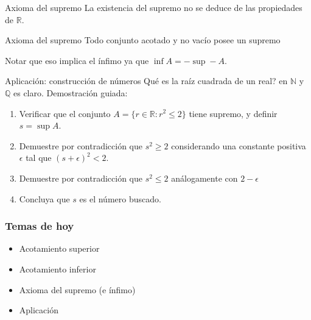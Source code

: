 \documentclass[14pt,aspectratio=169,xcolor=dvipsnames]{beamer}
\newcommand{\R}{\mathbb{R}}
\begin{document}
\begin{frame}{Axioma del supremo}
    La existencia del supremo no se deduce de las propiedades de $\R$. 
    \begin{block}{Axioma del supremo}
        Todo conjunto acotado y no vacío posee un supremo
    \end{block}
    \pause Notar que eso implica el ínfimo ya que $\inf A = - \sup -A$.
\end{frame}
\begin{frame}{Aplicación: construcción de números}
    Qué es la raíz cuadrada de un real? 
    \pause en $\mathbb N$ y $\mathbb Q$ es claro. Demostración guiada:
    \begin{enumerate}
        \item Verificar que el conjunto $A=\{r\in \R: r^2\leq2\}$ tiene supremo, y definir $s = \sup A$. 
        \item Demuestre por contradicción que $s^2\geq 2$ considerando una constante positiva $\epsilon$ tal que $(s+\epsilon)^2 < 2$.
        \item Demuestre por contradicción que $s^2\leq 2$ análogamente con $2-\epsilon$
        \item Concluya que $s$ es el número buscado.
    \end{enumerate}
\end{frame}
\begin{frame}\frametitle{Temas de hoy}
    \begin{itemize}
        \item Acotamiento superior
        \item Acotamiento inferior
        \item Axioma del supremo (e ínfimo)
        \item Aplicación
    \end{itemize}
\end{frame}
\begin{frame}
    \maketitle
\end{frame}
\end{document}
